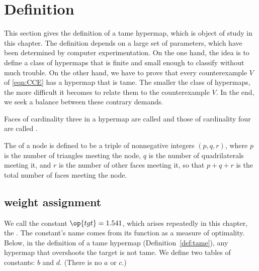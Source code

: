 \section{Definition}

This section gives the definition of a tame hypermap, which is object of study in
this chapter.    The definition depends on a large set of parameters, which have
been determined by computer experimentation.  On the one hand, the idea is to define a class
of hypermaps that is finite and small enough to classify without much trouble.
On the other hand, we have to prove that every counterexample $V$ of \eqref{eqn:CCE}
has a hypermap that is tame.  The smaller the class of hypermaps, the more difficult
it becomes to relate them to the counterexample $V$.  In the end, we seek a balance
between these contrary demands.


\begin{definition}
  Faces of cardinality three in a hypermap are called
   and those of cardinality four are called
  .
%
%
%
%
\end{definition}

\begin{definition}[type,~$(p,q,r)$]\label{definition:type}
The  of a node is defined to be a triple of
nonnegative integers $(p,q,r)$, where $p$ is the number of
triangles meeting the node, $q$ is the number of quadrilaterals
meeting it, and $r$ is the number of other faces meeting it, so that
$p+q+r$ is the total number of faces meeting the node.
%
%
%
\end{definition}


\subsection{weight assignment}\label{sec:wtassign}
%

We call the constant $\op{tgt}=1.541$, which arises repeatedly in this
chapter, the .  The constant's name comes from its
function as a measure of optimality. Below, in the definition of a tame
hypermap (Definition~\ref{def:tame}), any hypermap that overshoots the
target is not tame.  We define two tables of constants: $b$ and $d$.
(There is no $a$ or $c$.)
%
%
%


